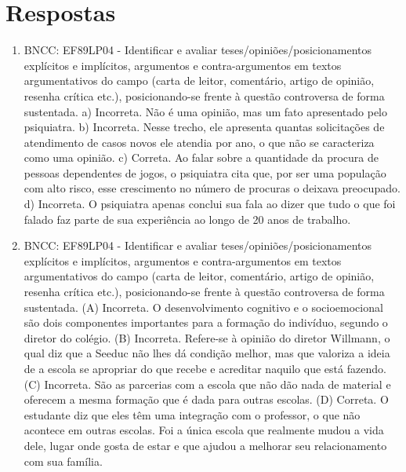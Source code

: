\chapter{Respostas}
\pagestyle{plain}
\footnotesize

\pagecolor{gray!40}


\begin{enumerate}
\item
BNCC: EF89LP04 - Identificar e avaliar teses/opiniões/posicionamentos explícitos e implícitos, argumentos e contra-argumentos em textos argumentativos do campo (carta de leitor, comentário, artigo de opinião, resenha crítica etc.), posicionando-se frente à questão controversa de forma sustentada. a) Incorreta. Não é uma opinião, mas um fato apresentado pelo psiquiatra. b) Incorreta. Nesse trecho, ele apresenta quantas solicitações de atendimento de casos novos ele atendia por ano, o que não se caracteriza como uma opinião. c) Correta. Ao falar sobre a quantidade da procura de pessoas dependentes de jogos, o psiquiatra cita que, por ser uma população com alto risco, esse crescimento no número de procuras o deixava preocupado. d) Incorreta. O psiquiatra apenas conclui sua fala ao dizer que tudo o que foi falado faz parte de sua experiência ao longo de 20 anos de trabalho.

\item
BNCC: EF89LP04 - Identificar e avaliar teses/opiniões/posicionamentos explícitos e implícitos, argumentos e contra-argumentos em textos argumentativos do campo (carta de leitor, comentário, artigo de opinião, resenha crítica etc.), posicionando-se frente à questão controversa de forma sustentada. (A) Incorreta. O desenvolvimento cognitivo e o socioemocional são dois componentes importantes para a formação do indivíduo, segundo o diretor do colégio. (B) Incorreta. Refere-se à opinião do diretor Willmann, o qual diz que a Seeduc não lhes dá condição melhor, mas que valoriza a ideia de a escola se apropriar do que recebe e acreditar naquilo que está fazendo. (C) Incorreta. São as parcerias com a escola que não dão nada de material e oferecem a mesma formação que é dada para outras escolas. (D) Correta. O estudante diz que eles têm uma integração com o professor, o que não acontece em outras escolas. Foi a única escola que realmente mudou a vida dele, lugar onde gosta de estar e que ajudou a melhorar seu relacionamento com sua família.


\end{enumerate}
